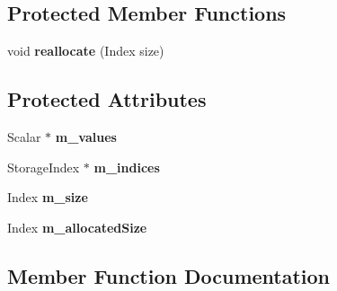 \subsection*{Protected Member Functions}
\begin{DoxyCompactItemize}
\item 
\mbox{\label{class_eigen_1_1internal_1_1_compressed_storage_ad9e41dc861c361ecc304fcff83da9ecd}} 
void {\bfseries reallocate} (Index size)
\end{DoxyCompactItemize}
\subsection*{Protected Attributes}
\begin{DoxyCompactItemize}
\item 
\mbox{\label{class_eigen_1_1internal_1_1_compressed_storage_ac620bc6061b228c215b81cf106c728c8}} 
Scalar $\ast$ {\bfseries m\+\_\+values}
\item 
\mbox{\label{class_eigen_1_1internal_1_1_compressed_storage_a41723f152d917dcf64f5b6e8b967f2e3}} 
Storage\+Index $\ast$ {\bfseries m\+\_\+indices}
\item 
\mbox{\label{class_eigen_1_1internal_1_1_compressed_storage_a8ef874ccc231de5fa4ee688092d31d1f}} 
Index {\bfseries m\+\_\+size}
\item 
\mbox{\label{class_eigen_1_1internal_1_1_compressed_storage_a9e133beed1bcc4582da39c00d9d08ee2}} 
Index {\bfseries m\+\_\+allocated\+Size}
\end{DoxyCompactItemize}


\subsection{Member Function Documentation}
\mbox{\label{class_eigen_1_1internal_1_1_compressed_storage_a0fe151c0217177fd43df764e8e0cdec2}} 
